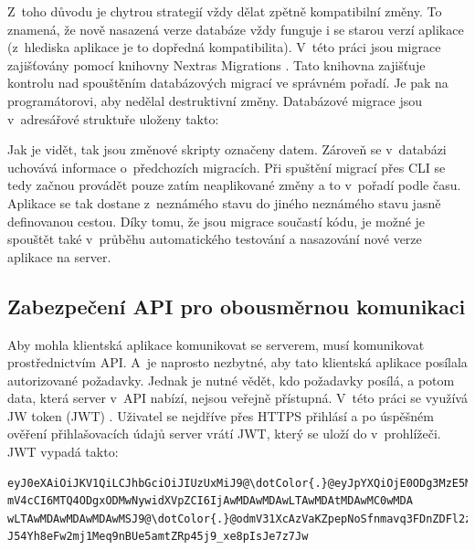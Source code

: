 Z~toho důvodu je chytrou strategií vždy dělat zpětně kompatibilní změny. To znamená, že nově nasazená verze databáze vždy funguje i se starou verzí aplikace (z~hlediska aplikace je to dopředná kompatibilita). V~této práci jsou migrace zajišťovány pomocí knihovny Nextras Migrations \cite{nextras:migrations}. Tato knihovna zajišťuje kontrolu nad spouštěním databázových migrací ve správném pořadí. Je pak na programátorovi, aby nedělal destruktivní změny. Databázové migrace jsou v~adresářové struktuře uloženy takto:

\vspace{1em}
\vspace{1em}

Jak je vidět, tak jsou změnové skripty označeny datem. Zároveň se v~databázi uchovává informace o~předchozích migracích. Při spuštění migrací přes CLI se tedy začnou provádět pouze zatím neaplikované změny a to v~pořadí podle času. Aplikace se tak dostane z~neznámého stavu do jiného neznámého stavu jasně definovanou cestou. Díky tomu, že jsou migrace součastí kódu, je možné je spouštět také v~průběhu automatického testování a nasazování nové verze aplikace na server.

\subsection{Zabezpečení API pro obousměrnou komunikaci}
Aby mohla klientská aplikace komunikovat se serverem, musí komunikovat prostřednictvím API. A~je naprosto nezbytné, aby tato klientská aplikace posílala autorizované požadavky. Jednak je nutné vědět, kdo požadavky posílá, a potom data, která server v~API nabízí, nejsou veřejně přístupná. V~této práci se využívá JW token (JWT) \cite{jwt}. Uživatel se nejdříve přes HTTPS přihlásí a po úspěšném ověření přihlašovacích údajů server vrátí JWT, který se uloží do  v~prohlížeči. JWT vypadá takto:

\newcommand{\reducedstrut}{\vrule width 0pt height .9\ht\strutbox depth .9\dp\strutbox\relax}
\newcommand{\dotColor}[1]{%
  \begingroup
  \setlength{\fboxsep}{0pt}%
  \colorbox{red}{\reducedstrut#1\/}%
  \endgroup
}
\begin{verbatim}
eyJ0eXAiOiJKV1QiLCJhbGciOiJIUzUxMiJ9@\dotColor{.}@eyJpYXQiOjE0ODg3MzE5MDcsI
mV4cCI6MTQ4ODgxODMwNywidXVpZCI6IjAwMDAwMDAwLTAwMDAtMDAwMC0wMDA
wLTAwMDAwMDAwMDAwMSJ9@\dotColor{.}@odmV31XcAzVaKZpepNoSfnmavq3FDnZDFl2zhfR6
J54Yh8eFw2mj1Meq9nBUe5amtZRp45j9_xe8pIsJe7z7Jw
\end{verbatim}

